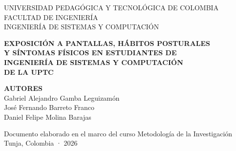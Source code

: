 
\begin{titlepage}
\begin{center}
\vspace*{1.5cm}
{\large UNIVERSIDAD PEDAGÓGICA Y TECNOLÓGICA DE COLOMBIA}\\[0.3cm]
{\large FACULTAD DE INGENIERÍA}\\[0.3cm]
{\large INGENIERÍA DE SISTEMAS Y COMPUTACIÓN}

\vspace{3cm}

{\Large\bfseries EXPOSICIÓN A PANTALLAS, HÁBITOS POSTURALES\\
Y SÍNTOMAS FÍSICOS EN ESTUDIANTES DE\\
INGENIERÍA DE SISTEMAS Y COMPUTACIÓN\\
DE LA UPTC}

\vspace{3cm}

{\bfseries AUTORES}\\[0.6cm]
Gabriel Alejandro Gamba Leguizamón\\
José Fernando Barreto Franco\\
Daniel Felipe Molina Barajas

\vfill

Documento elaborado en el marco del curso Metodología de la Investigación\\[0.3cm]
Tunja, Colombia · 2026

\end{center}
\end{titlepage}
